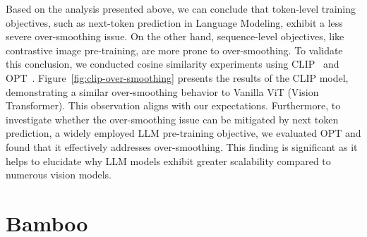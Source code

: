 \documentclass{article}
\theoremstyle{plain}
\theoremstyle{definition}
\theoremstyle{remark}
\begin{document}
Based on the analysis presented above, we can conclude that token-level training objectives, such as next-token prediction in Language Modeling, exhibit a less severe over-smoothing issue. On the other hand, sequence-level objectives, like contrastive image pre-training, are more prone to over-smoothing. To validate this conclusion, we conducted cosine similarity experiments using CLIP~\citep{radford2021learning} and OPT~\cite{zhang2022opt}.
Figure~\ref{fig:clip-over-smoothing} presents the results of the CLIP model, demonstrating a similar over-smoothing behavior to Vanilla ViT (Vision Transformer). This observation aligns with our expectations. Furthermore, to investigate whether the over-smoothing issue can be mitigated by next token prediction, a widely employed LLM pre-training objective, we evaluated OPT and found that it effectively addresses over-smoothing. This finding is significant as it helps to elucidate why LLM models exhibit greater scalability compared to numerous vision models.














































\section{Bamboo}\label{Bamboo}
\end{document}
